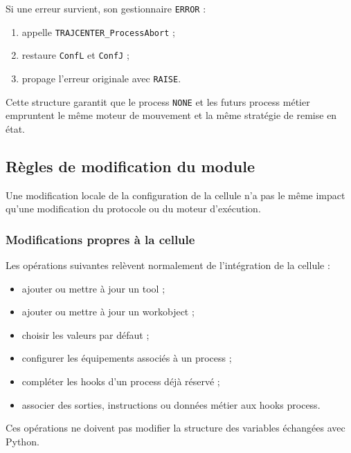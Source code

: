 \documentclass{rapportENSAM}
\begin{document}
Si une erreur survient, son gestionnaire \texttt{ERROR} :

\begin{enumerate}
    \item appelle \texttt{TRAJCENTER\_ProcessAbort} ;
    \item restaure \texttt{ConfL} et \texttt{ConfJ} ;
    \item propage l'erreur originale avec \texttt{RAISE}.
\end{enumerate}

Cette structure garantit que le process \texttt{NONE} et les futurs process
métier empruntent le même moteur de mouvement et la même stratégie de remise en
état.


\subsection{Règles de modification du module}
\label{subsec:rapid-module-modification-rules}

Une modification locale de la configuration de la cellule n'a pas le même
impact qu'une modification du protocole ou du moteur d'exécution.


\subsubsection{Modifications propres à la cellule}
\label{subsubsec:rapid-cell-local-changes}

Les opérations suivantes relèvent normalement de l'intégration de la cellule :

\begin{itemize}
    \item ajouter ou mettre à jour un tool ;
    \item ajouter ou mettre à jour un workobject ;
    \item choisir les valeurs par défaut ;
    \item configurer les équipements associés à un process ;
    \item compléter les hooks d'un process déjà réservé ;
    \item associer des sorties, instructions ou données métier aux hooks
    process.
\end{itemize}

Ces opérations ne doivent pas modifier la structure des variables échangées
avec Python.
\end{document}
